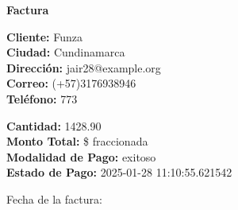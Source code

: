 \documentclass{article}
\begin{document}
\begin{center}
    {\LARGE \textbf{Factura}}\\[1cm]
\end{center}

\textbf{Cliente:} Funza \\
\textbf{Ciudad:} Cundinamarca \\
\textbf{Dirección:} jair28@example.org \\
\textbf{Correo:} (+57)3176938946 \\
\textbf{Teléfono:} 773 \\

\vspace{0.5cm}

\textbf{Cantidad:} 1428.90 \\
\textbf{Monto Total:} \$ fraccionada \\
\textbf{Modalidad de Pago:} exitoso \\
\textbf{Estado de Pago:} 2025-01-28 11:10:55.621542 \\

\vspace{1cm}

Fecha de la factura: 
\end{document}
